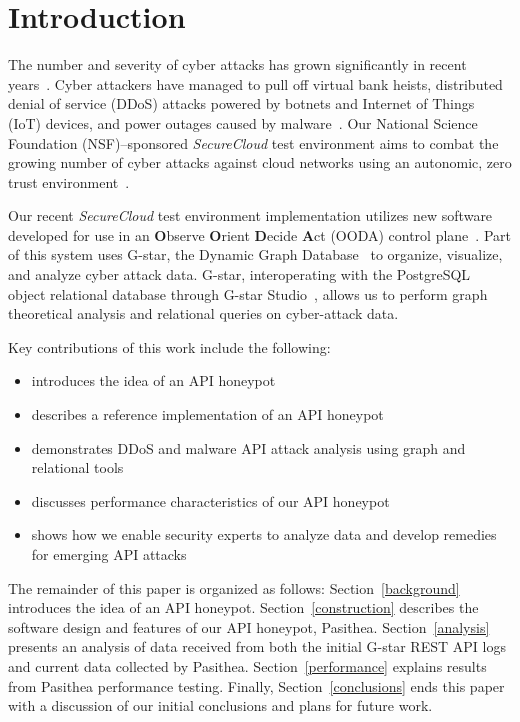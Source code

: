 
\section{Introduction} \label{intro}

The number and severity of cyber attacks has grown significantly in recent years~\cite{Symantec-Threat-Report,IBM-XForce-Report}. 
Cyber attackers have managed to pull off virtual bank heists, distributed denial of service (DDoS) attacks powered by botnets and Internet of Things (IoT) devices, and power outages caused by malware~\cite{IBM-XForce-Report}. 
Our National Science Foundation (NSF)--sponsored {\em SecureCloud} test environment aims to combat the growing number of cyber attacks against cloud networks using an autonomic, zero trust environment~\cite{7796146}.  

Our recent {\em SecureCloud} test environment implementation utilizes new software developed for use in an {\textbf O}bserve {\textbf O}rient {\textbf D}ecide {\textbf A}ct (OODA) control plane~\cite{something for OODA}.
Part of this system uses G-star, the Dynamic Graph Database~\cite{Labouseur-DAPD-2015} to organize, visualize, and analyze cyber attack data. 
G-star, interoperating with the PostgreSQL object relational database through G-star Studio~\cite{inroads-Labouseur16}, allows us to perform graph theoretical analysis and relational queries on cyber-attack data.  

Key contributions of this work include the following:
\begin{itemize}
   \item introduces the idea of an API honeypot
   \item describes a reference implementation of an API honeypot
   \item demonstrates DDoS and malware API attack analysis using graph and relational tools
   \item discusses performance characteristics of our API honeypot
   \item shows how we enable security experts to analyze data and develop remedies for emerging API attacks  
\end{itemize}

The remainder of this paper is organized as follows: 
Section~\ref{background} introduces the idea of an API honeypot. 
Section~\ref{construction} describes the software design and features of our API honeypot, Pasithea. 
Section~\ref{analysis} presents an analysis of data received from both the initial G-star REST API logs and current data collected by Pasithea. 
Section~\ref{performance} explains results from Pasithea performance testing.
Finally, Section~\ref{conclusions} ends this paper with a discussion of our initial conclusions and plans for future work.
